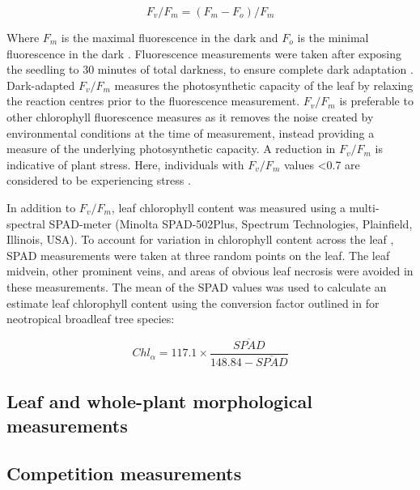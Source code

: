 \documentclass[a4paper, 11pt]{article}
\begin{document}
\begin{equation} \label{eq:fvfm}
F_v/F_m = (F_m - F_o)/F_m
\end{equation}

Where $F_m$ is the maximal fluorescence in the dark and $F_o$ is the minimal fluorescence in the dark \citep{Maxwell2000}. Fluorescence measurements were taken after exposing the seedling to 30 minutes of total darkness, to ensure complete dark adaptation \citep{Campbell2007}. Dark-adapted $F_v/F_m$ measures the photosynthetic capacity of the leaf by relaxing the reaction centres prior to the fluorescence measurement. $F_v/F_m$ is preferable to other chlorophyll fluorescence measures as it removes the noise created by environmental conditions at the time of measurement, instead providing a measure of the underlying photosynthetic capacity. A reduction in $F_v/F_m$ is indicative of plant stress. Here, individuals with $F_v/F_m$ values \textless{}0.7 are considered to be experiencing stress \citep{Maxwell2000}. 

In addition to $F_v/F_m$, leaf chlorophyll content was measured using a multi-spectral SPAD-meter (Minolta SPAD-502Plus, Spectrum Technologies, Plainfield, Illinois, USA). To account for variation in chlorophyll content across the leaf \citep{Serrano2008}, SPAD measurements were taken at three random points on the leaf. The leaf midvein, other prominent veins, and areas of obvious leaf necrosis were avoided in these measurements. The mean of the SPAD values was used to calculate an estimate leaf chlorophyll content using the conversion factor outlined in \citet{Coste2010} for neotropical broadleaf tree species:

\begin{equation} \label{eq:chl-spad}
Chl_\alpha = 117.1 \times \frac{\overline{SPAD}}{148.84 - \overline{SPAD}}
\end{equation}


\subsection{Leaf and whole-plant morphological measurements}

\subsection{Competition measurements}
\end{document}
